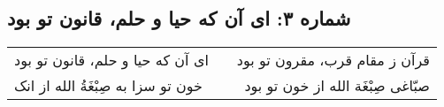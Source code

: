 \begin{center}
\section*{شماره ۳: ای آن که حیا و حلم، قانون تو بود}
\label{sec:003}
\begin{longtable}{l p{0.5cm} r}
ای آن که حیا و حلم، قانون تو بود
&&
قرآن ز مقام قرب، مقرون تو بود
\\
خون تو سزا به صِبْغَةُ الله از انک
&&
صبّاغی صِبْغَة الله از خون تو بود
\\
\end{longtable}
\end{center}
